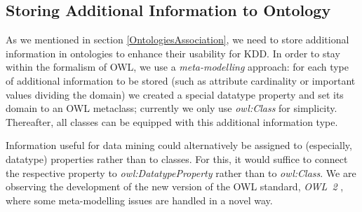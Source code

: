\subsection{Storing Additional Information to Ontology}

As we mentioned in section \ref{OntologiesAssociation}, we need to store additional information in ontologies to enhance their usability for KDD. %
In order to stay within the formalism of OWL, we use a \emph{meta-modelling} approach:
for each type of additional information to be stored (such as attribute cardinality or important values dividing the domain) we created a special datatype property and set its domain to an OWL metaclass; currently we only use \emph{owl:Class} for simplicity. 
Thereafter, all classes can be equipped with this additional information type. 

Information useful for data mining could alternatively be assigned to (especially, datatype) properties rather than to classes.
For this, it would suffice to connect the respective property to \emph{owl:DatatypeProperty} rather than to \emph{owl:Class}.
We are observing the development of the new version of the OWL standard, \emph{OWL~2} \cite{OWL2}, where some meta-modelling issues are handled in a novel way.

